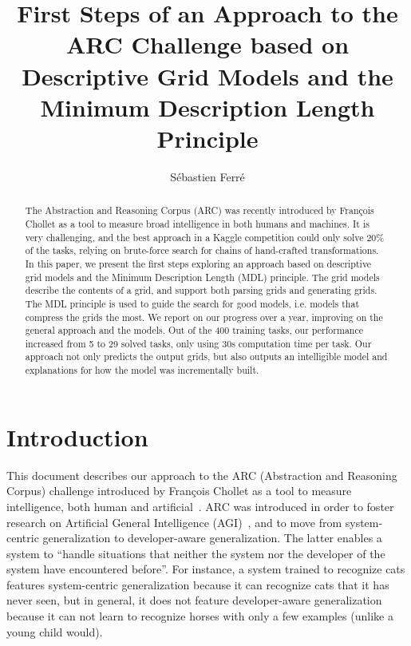 \documentclass[a4paper]{llncs}
\newcommand{\HIDE}[1]{}
\begin{document}
\title{First Steps of an Approach to the ARC Challenge based on Descriptive Grid Models and the Minimum Description Length Principle}

\author{Sébastien Ferré}


\maketitle

\begin{abstract}
  The Abstraction and Reasoning Corpus (ARC) was recently introduced
  by François Chollet as a tool to measure broad intelligence in both
  humans and machines. It is very challenging, and the best approach
  in a Kaggle competition could only solve 20\% of the tasks, relying
  on brute-force search for chains of hand-crafted transformations.
  In this paper, we present the first steps exploring an approach
  based on descriptive grid models and the Minimum Description Length
  (MDL) principle. The grid models describe the contents of a grid,
  and support both parsing grids and generating grids. The MDL
  principle is used to guide the search for good models, i.e. models
  that compress the grids the most.
  We report on our progress over a year, improving on the general
  approach and the models. Out of the 400 training tasks, our
  performance increased from 5 to 29 solved tasks, only using 30s
  computation time per task. Our approach not only predicts the output
  grids, but also outputs an intelligible model and explanations for
  how the model was incrementally built.
\end{abstract}

\HIDE{
Measure of Intelligence
Artificial Intelligence
Explainable AI
Program Synthesis
Structured Prediction
Minimum Description Length
2D Parsing
}

\sloppy

\section{Introduction}
\label{intro}

This document describes our approach to the ARC (Abstraction and
Reasoning Corpus) challenge introduced by François Chollet as a tool
to measure intelligence, both human and artificial~\cite{Chollet2019}.
ARC was introduced in order to foster research on Artificial General
Intelligence (AGI)~\cite{Goertzel2014agi}, and to move from
system-centric generalization to developer-aware
generalization. The latter enables a system to ``handle situations
that neither the system nor the developer of the system have
encountered before''. For instance, a system trained to recognize cats
features system-centric generalization because it can recognize cats
that it has never seen, but in general, it does not feature
developer-aware generalization because it can not learn to recognize
horses with only a few examples (unlike a young child would).
\end{document}
